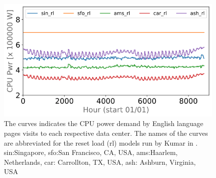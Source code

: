 
\begin{figure}[h]\centering
\vspace{0 pt}
    \includegraphics[scale=0.5]{embodied_cost_model/images/cpu_profile.png}
    \caption[CPU Workload Profile]{The curves indicates the CPU power demand by English language pages visits to each respective data center. The names of the curves are abbreviated for the reset load (rl) models run by Kumar in \cite{kumar20}.  sin:Singapore, sfo:San Francisco, CA, USA, ams:Haarlem, Netherlands, car: Carrollton, TX, USA, ash: Ashburn, Virginia, USA}
    \label{image:cpu_profile}
    \vspace{-2 pt}
    \end{figure}